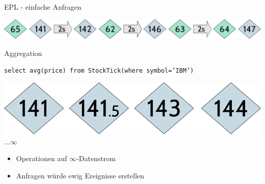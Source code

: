 \documentclass{beamer}
\begin{document}
\begin{frame}{EPL - einfache Anfragen}
\begin{center}
    \includegraphics[scale=0.35]{img/stream-1}
\end{center}
\begin{exampleblock}{\centering Aggregation}
    \begin{center}
        \texttt{select avg(price) from StockTick(where symbol='IBM')}
    \end{center}
\end{exampleblock}
\begin{center}
    \includegraphics[scale=0.2]{img/solution-2}$\dots \infty$
\end{center}

\pause
\begin{alertblock}{}
    \begin{itemize}
        \item Operationen auf $\infty$-Datenstrom
        \item Anfragen würde ewig Ereignisse erstellen
    \end{itemize}
\end{alertblock}

\end{frame}
\end{document}
